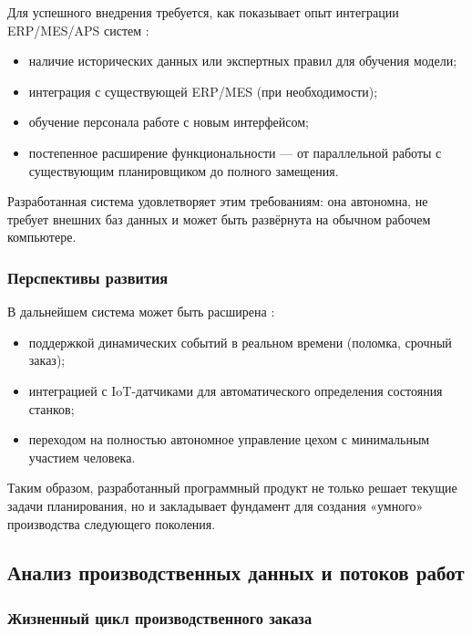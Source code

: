 Для успешного внедрения требуется, как показывает опыт интеграции ERP/MES/APS систем \cite{machinostroy, ivashen}:

\begin{itemize}
    \item наличие исторических данных или экспертных правил для обучения модели;
    \item интеграция с существующей ERP/MES (при необходимости);
    \item обучение персонала работе с новым интерфейсом;
    \item постепенное расширение функциональности — от параллельной работы с существующим планировщиком до полного замещения.
\end{itemize}

Разработанная система удовлетворяет этим требованиям: она автономна, не требует внешних баз данных и может быть развёрнута на обычном рабочем компьютере.

\subsubsection{Перспективы развития}

В дальнейшем система может быть расширена \cite{alexa}:

\begin{itemize}
    \item поддержкой динамических событий в реальном времени (поломка, срочный заказ);
    \item интеграцией с IoT-датчиками для автоматического определения состояния станков;
    \item переходом на полностью автономное управление цехом с минимальным участием человека.
\end{itemize}

Таким образом, разработанный программный продукт не только решает текущие задачи планирования, но и закладывает фундамент для создания «умного» производства следующего поколения.

\subsection{Анализ производственных данных и потоков работ}

\subsubsection{Жизненный цикл производственного заказа}

